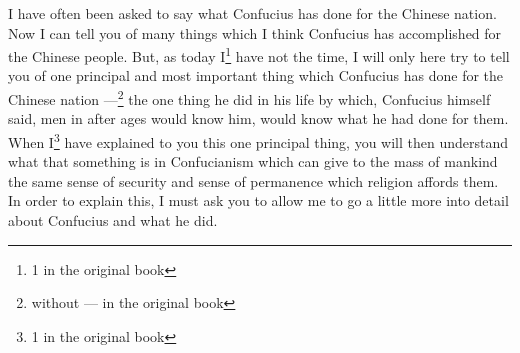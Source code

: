 I have often been asked to say what Confucius has done for the Chinese nation.
Now I can tell you of many things which I think Confucius has accomplished for the Chinese people.
But, as today I\footnote{1 in the original book} have not the time, I will only here try to tell you of one principal and most important thing which Confucius has done for the Chinese nation ---\footnote{without --- in the original book} the one thing he did in his life by which, Confucius himself said, men in after ages would know him, would know what he had done for them.
When I\footnote{1 in the original book} have explained to you this one principal thing, you will then understand what that something is in Confucianism which can give to the mass of mankind the same sense of security and sense of permanence which religion affords them.
In order to explain this, I must ask you to allow me to go a little more into detail about Confucius and what he did.

